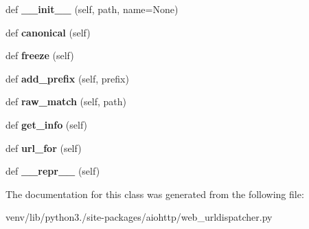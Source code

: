 \begin{DoxyCompactItemize}
\item 
\mbox{\label{classaiohttp_1_1web__urldispatcher_1_1_plain_resource_ae73df0db545c1f91bfa9f54fd81a9c8d}} 
def {\bfseries \+\_\+\+\_\+init\+\_\+\+\_\+} (self, path, name=None)
\item 
\mbox{\label{classaiohttp_1_1web__urldispatcher_1_1_plain_resource_a2c33e1b523f367b488ecd27a8465c422}} 
def {\bfseries canonical} (self)
\item 
\mbox{\label{classaiohttp_1_1web__urldispatcher_1_1_plain_resource_aa2883d2fa37e73bb61f3bd1c115df350}} 
def {\bfseries freeze} (self)
\item 
\mbox{\label{classaiohttp_1_1web__urldispatcher_1_1_plain_resource_a0883db6b3c07d699c9f2c09df6e2e7ff}} 
def {\bfseries add\+\_\+prefix} (self, prefix)
\item 
\mbox{\label{classaiohttp_1_1web__urldispatcher_1_1_plain_resource_a175da5e84832d647f7cbbb545da14e24}} 
def {\bfseries raw\+\_\+match} (self, path)
\item 
\mbox{\label{classaiohttp_1_1web__urldispatcher_1_1_plain_resource_af3e2177b4fd0cbdc7b74ddbed956e000}} 
def {\bfseries get\+\_\+info} (self)
\item 
\mbox{\label{classaiohttp_1_1web__urldispatcher_1_1_plain_resource_ac8c896e22573267cafcde545dacafb2f}} 
def {\bfseries url\+\_\+for} (self)
\item 
\mbox{\label{classaiohttp_1_1web__urldispatcher_1_1_plain_resource_a335f93759514ee8322aaf5385b23032a}} 
def {\bfseries \+\_\+\+\_\+repr\+\_\+\+\_\+} (self)
\end{DoxyCompactItemize}


The documentation for this class was generated from the following file\+:\begin{DoxyCompactItemize}
\item 
venv/lib/python3./site-\/packages/aiohttp/web\+\_\+urldispatcher.\+py\end{DoxyCompactItemize}
